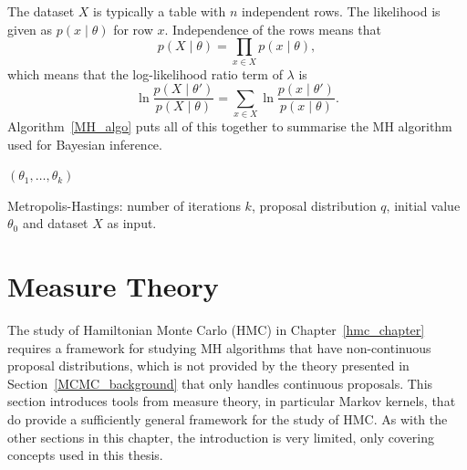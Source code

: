 \documentclass[english,twoside,openright]{HYgraduMLDS}
\begin{document}
The dataset \(X\) is typically a table with \(n\) independent rows.
The likelihood is given as \(p(x\mid \theta)\)
for row \(x\). Independence of the rows means that
\[
    p(X\mid \theta) = \prod_{x\in X} p(x\mid \theta),
\]
which means that the log-likelihood ratio term of \(\lambda\) is
\[
    \ln \frac{p(X\mid \theta')}{p(X\mid \theta)}
    = \sum_{x\in X} \ln\frac{p(x\mid \theta')}{p(x\mid \theta)}.
\]
Algorithm~\ref{MH_algo} puts all of this together to summarise the MH 
algorithm used for Bayesian inference.

\begin{algorithm}[H]\label{MH_algo}
    \SetAlgoLined
    \Return \((\theta_1, \dotsc, \theta_k)\)
    \caption{
        Metropolis-Hastings: number of iterations \(k\), proposal 
        distribution \(q\), initial value \(\theta_0\) and
        dataset \(X\) as input.
    }
\end{algorithm}

\section{Measure Theory}

The study of Hamiltonian Monte Carlo (HMC) in Chapter~\ref{hmc_chapter}
requires a framework for studying MH algorithms
that have non-continuous proposal distributions, which is not provided
by the theory presented in Section~\ref{MCMC_background} that only handles
continuous proposals.
This section introduces tools from measure theory, in particular
Markov kernels, that do provide a sufficiently general
framework for the study of HMC. As with the other sections in this chapter,
the introduction is very limited, only covering concepts used in this thesis.
\end{document}
